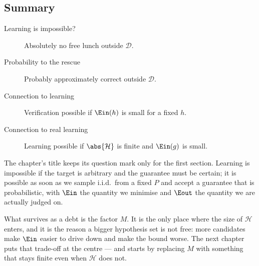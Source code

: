 \hrulebar

\subsection*{Summary}

\begin{description}
    \item[Learning is impossible?] Absolutely no free lunch outside
        \(\mathcal{D}\).
    \item[Probability to the rescue] Probably approximately correct outside
        \(\mathcal{D}\).
    \item[Connection to learning] Verification possible if \(\Ein(h)\) is small
        for a fixed \(h\).
    \item[Connection to real learning] Learning possible if \(\abs{\mathcal{H}}\)
        is finite and \(\Ein(g)\) is small.
\end{description}

The chapter's title keeps its question mark only for the first section. Learning
is impossible if the target is arbitrary and the guarantee must be certain; it
is possible as soon as we sample i.i.d.\ from a fixed \(P\) and accept a
guarantee that is probabilistic, with \(\Ein\) the quantity we minimise and
\(\Eout\) the quantity we are actually judged on.

What survives as a debt is the factor \(M\). It is the only place where the size
of \(\mathcal{H}\) enters, and it is the reason a bigger hypothesis set is not
free: more candidates make \(\Ein\) easier to drive down and make the bound
worse. The next chapter puts that trade-off at the centre --- and starts by
replacing \(M\) with something that stays finite even when \(\mathcal{H}\) does
not.
